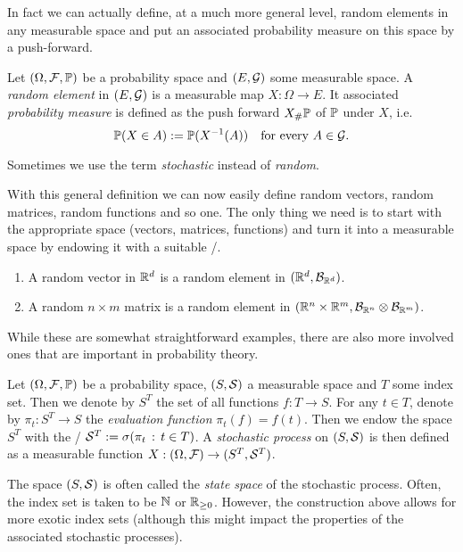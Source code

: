 In fact we can actually define, at a much more general level, random elements in any measurable space and put an associated probability measure on this space by a push-forward.

\begin{definition}
Let $(\Omega,\mathcal F, \mathbb P)$ be a probability space and $(E,\mathcal G)$ some measurable space. A \emph{random element} in $(E,\mathcal G)$ is a measurable map $X : \Omega \to E$. It associated \emph{probability measure} is defined as the push forward $X_\# \mathbb P$ of $\mathbb P$ under $X$, i.e.
\[
	\mathbb P(X \in A) := \mathbb P(X^{-1}(A)) \quad \text{for every } A \in \mathcal G.
\]
\end{definition}

Sometimes we use the term \emph{stochastic} instead of \emph{random}. 

With this general definition we can now easily define random vectors, random matrices, random functions and so one. The only thing we need is to start with the appropriate space (vectors, matrices, functions) and turn it into a measurable space by endowing it with a suitable \sigalg/. 

\begin{example}
\hfill
\begin{enumerate}[label=(\alph*)]
\item A random vector in $\mathbb R^d$ is a random element in $(\mathbb R^d, \mathcal B_{\mathbb R^d})$.
\item A random $n \times m$ matrix is a random element in $(\mathbb R^n \times \mathbb R^m, \mathcal B_{\mathbb R^n} \otimes \mathcal B_{\mathbb R^m})$.
\end{enumerate}
\end{example}

While these are somewhat straightforward examples, there are also more involved ones that are important in probability theory.

\begin{example}
Let $(\Omega,\mathcal F,\mathbb P)$ be a probability space, $(S,\mathcal S)$ a measurable space and $T$ some index set. Then we denote by $S^T$ the set of all functions $f : T \to S$. For any $t \in T$, denote by $\pi_t : S^T \to S$ the \emph{evaluation function} $\pi_t(f) = f(t)$. Then we endow the space $S^T$ with the \sigalg/ $\mathcal S^T := \sigma(\pi_t \, : \, t\in T)$. A \emph{stochastic process} on $(S,\mathcal S)$ is then defined as a measurable function $X : (\Omega,\mathcal F) \to (S^T, \mathcal S^T)$.

The space $(S,\mathcal S)$ is often called the \emph{state space} of the stochastic process. Often, the index set is taken to be $\mathbb N$ or $\mathbb R_{\ge 0}$. However, the construction above allows for more exotic index sets (although this might impact the properties of the associated stochastic processes).
\end{example}

